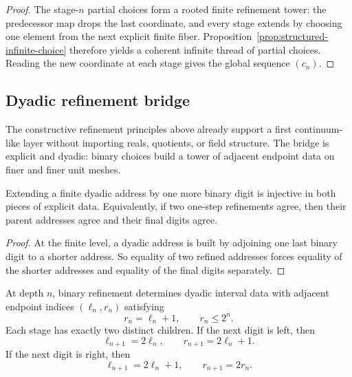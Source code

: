 \begin{proof}
The stage-$n$ partial choices form a rooted finite refinement tower: the predecessor map drops the last coordinate, and every stage extends by choosing one element from the next explicit finite fiber. Proposition~\ref{prop:structured-infinite-choice} therefore yields a coherent infinite thread of partial choices. Reading the new coordinate at each stage gives the global sequence $(c_n)$.
\end{proof}

\subsection{Dyadic refinement bridge}

The constructive refinement principles above already support a first continuum-like layer without importing reals, quotients, or field structure.
The bridge is explicit and dyadic: binary choices build a tower of adjacent endpoint data on finer and finer unit meshes.

\begin{proposition}\label{prop:dyadic-address-injective}
Extending a finite dyadic address by one more binary digit is injective in both pieces of explicit data.
Equivalently, if two one-step refinements agree, then their parent addresses agree and their final digits agree.
\end{proposition}

\begin{proof}
At the finite level, a dyadic address is built by adjoining one last binary digit to a shorter address.
So equality of two refined addresses forces equality of the shorter addresses and equality of the final digits separately.
\end{proof}

\begin{proposition}\label{prop:dyadic-refinement}
At depth $n$, binary refinement determines dyadic interval data with adjacent endpoint indices $(\ell_n,r_n)$ satisfying
\[
r_n = \ell_n + 1,
\qquad
r_n \le 2^n.
\]
Each stage has exactly two distinct children.
If the next digit is left, then
\[
\ell_{n+1} = 2\ell_n,
\qquad
r_{n+1} = 2\ell_n + 1.
\]
If the next digit is right, then
\[
\ell_{n+1} = 2\ell_n + 1,
\qquad
r_{n+1} = 2r_n.
\]
\end{proposition}

